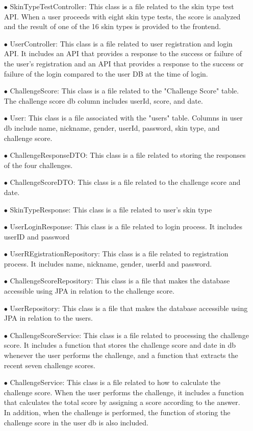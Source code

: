 \documentclass[conference]{IEEEtran}
\begin{document}
\begin{itemize}
\begin{itemize}
        \item[$\bullet$] SkinTypeTestController: This class is a file related to the skin type test API. When a user proceeds with eight skin type tests, the score is analyzed and the result of one of the 16 skin types is provided to the frontend.
        \item[$\bullet$] UserController: This class is a file related to user registration and login API. It includes an API that provides a response to the success or failure of the user's registration and an API that provides a response to the success or failure of the login compared to the user DB at the time of login.
        \item[$\bullet$] ChallengeScore: This class is a file related to the "Challenge Score" table. The challenge score db column includes userId, score, and date.
        \item[$\bullet$] User: This class is a file associated with the "users" table. Columns in user db include name, nickname, gender, userId, password, skin type, and challenge score.
        \item[$\bullet$] ChallengeResponseDTO: This class is a file related to storing the responses of the four challenges.
        \item[$\bullet$] ChallengeScoreDTO: This class is a file related to the challenge score and date.
        \item[$\bullet$] SkinTypeResponse: This class is a file related to user's skin type
        \item[$\bullet$] UserLoginResponse: This class is a file related to login process. It includes userID and password
        \item[$\bullet$] UserREgistrationRepository: This class is a file related to registration process. It includes name, nickname, gender, userId and password.
        \item[$\bullet$] ChallengeScoreRepository: This class is a file that makes the database accessible using JPA in relation to the challenge score.
        \item[$\bullet$] UserRepository: This class is a file that makes the database accessible using JPA in relation to the users.
        \item[$\bullet$] ChallengeScoreService: This class is a file related to processing the challenge score. It includes a function that stores the challenge score and date in db whenever the user performs the challenge, and a function that extracts the recent seven challenge scores.
        \item[$\bullet$] ChallengeService: This class is a file related to how to calculate the challenge score. When the user performs the challenge, it includes a function that calculates the total score by assigning a score according to the answer. In addition, when the challenge is performed, the function of storing the challenge score in the user db is also included.

\end{itemize}
\end{itemize}
\end{document}

